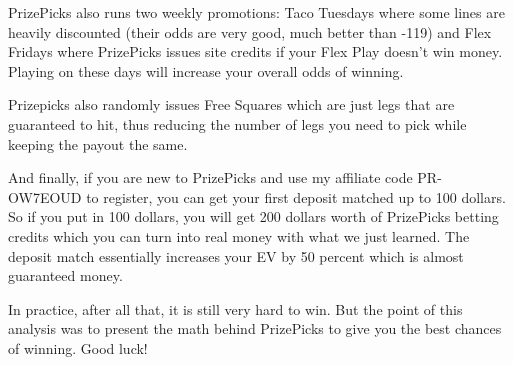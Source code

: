 PrizePicks also runs two weekly promotions: Taco Tuesdays where some lines are heavily discounted (their odds are very good, much better than -119) and Flex Fridays where PrizePicks issues site credits if your Flex Play doesn’t win money. Playing on these days will increase your overall odds of winning.

Prizepicks also randomly issues Free Squares which are just legs that are guaranteed to hit, thus reducing the number of legs you need to pick while keeping the payout the same. 

And finally, if you are new to PrizePicks and use my affiliate code PR-OW7EOUD to register, you can get your first deposit matched up to 100 dollars. So if you put in 100 dollars, you will get 200 dollars worth of PrizePicks betting credits which you can turn into real money with what we just learned. The deposit match essentially increases your EV by 50 percent which is almost guaranteed money. 

In practice, after all that, it is still very hard to win. But the point of this analysis was to present the math behind PrizePicks to give you the best chances of winning. Good luck!
